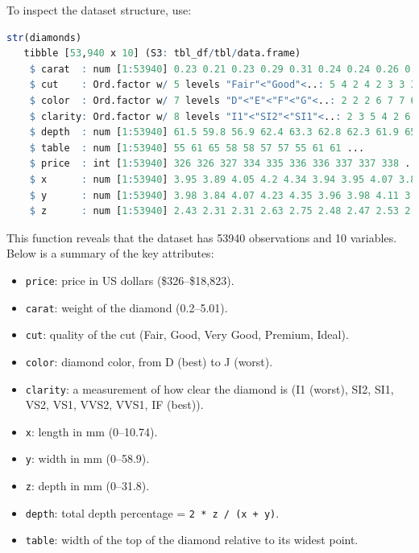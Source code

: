 \documentclass[
]{book}
\newcommand{\passthrough}[1]{#1}
\providecommand{\tightlist}{%
  \setlength{\itemsep}{0pt}\setlength{\parskip}{0pt}}
\theoremstyle{definition}
\theoremstyle{definition}
\theoremstyle{definition}
\theoremstyle{definition}
\theoremstyle{remark}
\begin{document}
To inspect the dataset structure, use:

\begin{lstlisting}[language=R]
str(diamonds)   
   tibble [53,940 x 10] (S3: tbl_df/tbl/data.frame)
    $ carat  : num [1:53940] 0.23 0.21 0.23 0.29 0.31 0.24 0.24 0.26 0.22 0.23 ...
    $ cut    : Ord.factor w/ 5 levels "Fair"<"Good"<..: 5 4 2 4 2 3 3 3 1 3 ...
    $ color  : Ord.factor w/ 7 levels "D"<"E"<"F"<"G"<..: 2 2 2 6 7 7 6 5 2 5 ...
    $ clarity: Ord.factor w/ 8 levels "I1"<"SI2"<"SI1"<..: 2 3 5 4 2 6 7 3 4 5 ...
    $ depth  : num [1:53940] 61.5 59.8 56.9 62.4 63.3 62.8 62.3 61.9 65.1 59.4 ...
    $ table  : num [1:53940] 55 61 65 58 58 57 57 55 61 61 ...
    $ price  : int [1:53940] 326 326 327 334 335 336 336 337 337 338 ...
    $ x      : num [1:53940] 3.95 3.89 4.05 4.2 4.34 3.94 3.95 4.07 3.87 4 ...
    $ y      : num [1:53940] 3.98 3.84 4.07 4.23 4.35 3.96 3.98 4.11 3.78 4.05 ...
    $ z      : num [1:53940] 2.43 2.31 2.31 2.63 2.75 2.48 2.47 2.53 2.49 2.39 ...
\end{lstlisting}

This function reveals that the dataset has 53940 observations and 10 variables. Below is a summary of the key attributes:

\begin{itemize}
\tightlist
\item
  \passthrough{\lstinline!price!}: price in US dollars (\$326--\$18,823).
\item
  \passthrough{\lstinline!carat!}: weight of the diamond (0.2--5.01).
\item
  \passthrough{\lstinline!cut!}: quality of the cut (Fair, Good, Very Good, Premium, Ideal).
\item
  \passthrough{\lstinline!color!}: diamond color, from D (best) to J (worst).
\item
  \passthrough{\lstinline!clarity!}: a measurement of how clear the diamond is (I1 (worst), SI2, SI1, VS2, VS1, VVS2, VVS1, IF (best)).
\item
  \passthrough{\lstinline!x!}: length in mm (0--10.74).
\item
  \passthrough{\lstinline!y!}: width in mm (0--58.9).
\item
  \passthrough{\lstinline!z!}: depth in mm (0--31.8).
\item
  \passthrough{\lstinline!depth!}: total depth percentage = \passthrough{\lstinline!2 * z / (x + y)!}.
\item
  \passthrough{\lstinline!table!}: width of the top of the diamond relative to its widest point.
\end{itemize}
\end{document}

